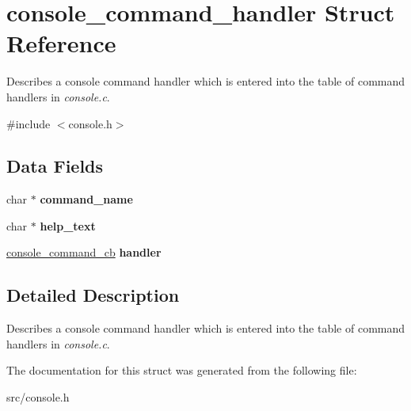 \hypertarget{structconsole__command__handler}{}\section{console\+\_\+command\+\_\+handler Struct Reference}
\label{structconsole__command__handler}


Describes a console command handler which is entered into the table of command handlers in {\itshape console.\+c}.  




{\ttfamily \#include $<$console.\+h$>$}

\subsection*{Data Fields}
\begin{DoxyCompactItemize}
\item 
\hypertarget{structconsole__command__handler_a2a3d3ad144351727f7fe1b1c34f7d0e9}{}char $\ast$ {\bfseries command\+\_\+name}\label{structconsole__command__handler_a2a3d3ad144351727f7fe1b1c34f7d0e9}

\item 
\hypertarget{structconsole__command__handler_af5847bc7d5eb0c49c0f031d4a3edd07b}{}char $\ast$ {\bfseries help\+\_\+text}\label{structconsole__command__handler_af5847bc7d5eb0c49c0f031d4a3edd07b}

\item 
\hypertarget{structconsole__command__handler_aeea0cea250d1fb3881fcd35d08a0b7e0}{}\hyperlink{group__console_ga15a89293092907a5f16a723ac26c123f}{console\+\_\+command\+\_\+cb} {\bfseries handler}\label{structconsole__command__handler_aeea0cea250d1fb3881fcd35d08a0b7e0}

\end{DoxyCompactItemize}


\subsection{Detailed Description}
Describes a console command handler which is entered into the table of command handlers in {\itshape console.\+c}. 

The documentation for this struct was generated from the following file\+:\begin{DoxyCompactItemize}
\item 
src/console.\+h\end{DoxyCompactItemize}
